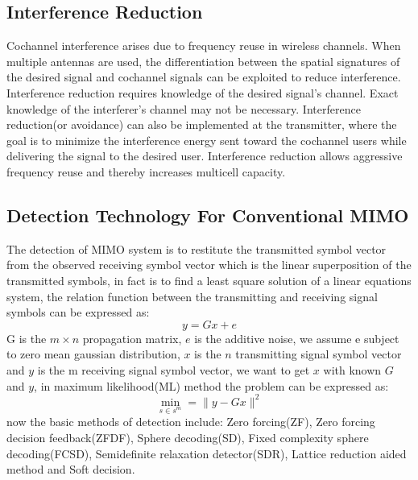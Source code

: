 \documentclass[conference]{IEEEtran}
\begin{document}
\subsection{Interference Reduction}
Cochannel interference arises due to frequency reuse in wireless channels. When multiple antennas are used, the differentiation between the spatial signatures of the desired
signal and cochannel signals can be exploited to reduce interference. Interference reduction requires knowledge of the desired signal's channel. Exact knowledge of the interferer's channel may not be necessary. Interference reduction(or avoidance) can also be implemented at the transmitter, where the goal is to minimize the interference energy sent toward the cochannel users while delivering the signal to the desired user. Interference reduction allows aggressive frequency reuse and thereby increases multicell capacity\cite{9}.
\subsection{Detection Technology For Conventional MIMO}
The detection of MIMO system is to restitute the transmitted symbol vector from the observed receiving symbol vector which is the linear superposition of the transmitted symbols, in fact is to find a least square solution of a linear equations system, the relation function between the transmitting and receiving signal symbols can be expressed as:
\begin{equation}
y=Gx+e\label{equation:1}
\end{equation}
G is the $m\times n$ propagation matrix, $e$ is the additive noise, we assume e subject to zero mean gaussian distribution, $x$ is the $n$ transmitting signal symbol vector and $y$ is the m receiving signal symbol vector, we want to get $x$ with known $G$ and $y$, in maximum likelihood(ML) method the problem can be expressed as:
\begin{equation}
\min_{s\in s^m}=\|y-Gx\|^2\label{equation:2}
\end{equation}
now the basic methods of detection include: Zero forcing(ZF), Zero forcing decision feedback(ZFDF), Sphere decoding(SD), Fixed complexity sphere decoding(FCSD), Semidefinite relaxation detector(SDR), Lattice reduction aided method and Soft decision\cite{10}\cite{5}.\newline
\end{document}
